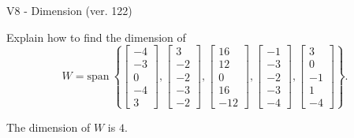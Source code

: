 \begin{exercise}
  \begin{exerciseTitle}V8 - Dimension (ver. 122)\end{exerciseTitle}
  \begin{exerciseStatement}
    Explain how to find the dimension of 
\[W=\mathrm{span}\ \left\{\left[\begin{array}{r}
-4 \\
-3 \\
0 \\
-4 \\
3
\end{array}\right] , \left[\begin{array}{r}
3 \\
-2 \\
-2 \\
-3 \\
-2
\end{array}\right] , \left[\begin{array}{r}
16 \\
12 \\
0 \\
16 \\
-12
\end{array}\right] , \left[\begin{array}{r}
-1 \\
-3 \\
-2 \\
-3 \\
-4
\end{array}\right] , \left[\begin{array}{r}
3 \\
0 \\
-1 \\
1 \\
-4
\end{array}\right]\right\}.\]



  \end{exerciseStatement}
  \begin{exerciseAnswer}
   The dimension of \(W\) is  \(4\).
  


  \end{exerciseAnswer}
\end{exercise}